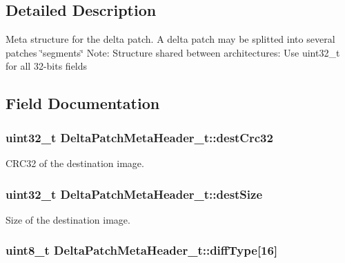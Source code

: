\subsection{Detailed Description}
Meta structure for the delta patch. A delta patch may be splitted into several patches \char`\"{}segments\char`\"{} Note\+: Structure shared between architectures\+: Use uint32\+\_\+t for all 32-\/bits fields 

\subsection{Field Documentation}
\subsubsection[{\texorpdfstring{dest\+Crc32}{destCrc32}}]{\setlength{\rightskip}{0pt plus 5cm}uint32\+\_\+t Delta\+Patch\+Meta\+Header\+\_\+t\+::dest\+Crc32}\hypertarget{struct_delta_patch_meta_header__t_ad9ecfc6ecd1094b005c10c4173e1966d}{}\label{struct_delta_patch_meta_header__t_ad9ecfc6ecd1094b005c10c4173e1966d}


C\+R\+C32 of the destination image. 

\subsubsection[{\texorpdfstring{dest\+Size}{destSize}}]{\setlength{\rightskip}{0pt plus 5cm}uint32\+\_\+t Delta\+Patch\+Meta\+Header\+\_\+t\+::dest\+Size}\hypertarget{struct_delta_patch_meta_header__t_a461597a63fa08f6d8154d8783b42fbc2}{}\label{struct_delta_patch_meta_header__t_a461597a63fa08f6d8154d8783b42fbc2}


Size of the destination image. 

\subsubsection[{\texorpdfstring{diff\+Type}{diffType}}]{\setlength{\rightskip}{0pt plus 5cm}uint8\+\_\+t Delta\+Patch\+Meta\+Header\+\_\+t\+::diff\+Type\mbox{[}16\mbox{]}}\hypertarget{struct_delta_patch_meta_header__t_a915e5fc5b0f34fa2357381f7d3fc317d}{}\label{struct_delta_patch_meta_header__t_a915e5fc5b0f34fa2357381f7d3fc317d}


